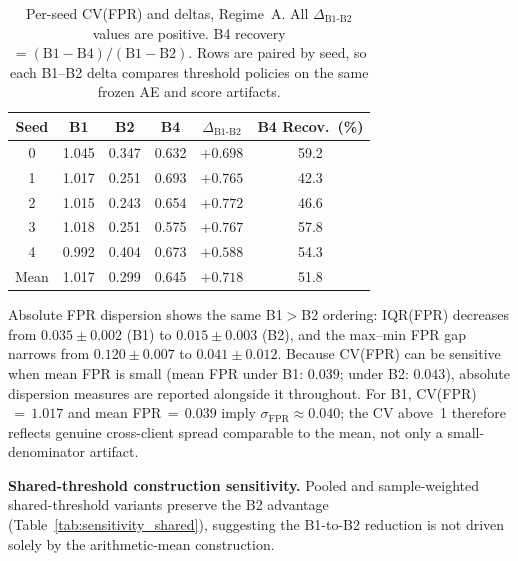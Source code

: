 \begin{table}[t]
  \caption{Per-seed CV(FPR) and deltas, Regime~A.
           All $\Delta_{\text{B1-B2}}$ values are positive.
           B4 recovery $= (\text{B1} - \text{B4}) / (\text{B1} - \text{B2})$.
           Rows are paired by seed, so each B1--B2 delta compares threshold policies on the same frozen AE and score artifacts.}
  \label{tab:per_seed}
  \centering
  \footnotesize
  \renewcommand{\arraystretch}{1.2}%
  \setlength{\tabcolsep}{4pt}%
  \begin{tabular}{cccccc}
    \toprule
    Seed & B1 & B2 & B4 & $\Delta_{\text{B1-B2}}$ & B4 Recov.\ (\%) \\
    \midrule
    0 & 1.045 & 0.347 & 0.632 & $+0.698$ & 59.2 \\
    1 & 1.017 & 0.251 & 0.693 & $+0.765$ & 42.3 \\
    2 & 1.015 & 0.243 & 0.654 & $+0.772$ & 46.6 \\
    3 & 1.018 & 0.251 & 0.575 & $+0.767$ & 57.8 \\
    4 & 0.992 & 0.404 & 0.673 & $+0.588$ & 54.3 \\
    \midrule
    Mean & 1.017 & 0.299 & 0.645 & $+0.718$ & 51.8 \\
    \bottomrule
  \end{tabular}
\end{table}

Absolute FPR dispersion shows the same B1$>$B2 ordering:
IQR(FPR) decreases from $0.035\pm0.002$ (B1) to $0.015\pm0.003$ (B2),
and the max--min FPR gap narrows from $0.120\pm0.007$ to $0.041\pm0.012$.
Because CV(FPR) can be sensitive when mean FPR is small (mean FPR under B1: $0.039$;
under B2: $0.043$), absolute dispersion measures are reported alongside it throughout.
For B1, CV(FPR)$\,{=}\,1.017$ and mean FPR$\,{=}\,0.039$ imply $\sigma_{\text{FPR}} \approx 0.040$;
the CV above~1 therefore reflects genuine cross-client spread comparable to the mean,
not only a small-denominator artifact.

\textbf{Shared-threshold construction sensitivity.}
Pooled and sample-weighted shared-threshold variants preserve the B2 advantage
(Table~\ref{tab:sensitivity_shared}), suggesting the B1-to-B2 reduction is not
driven solely by the arithmetic-mean construction.

